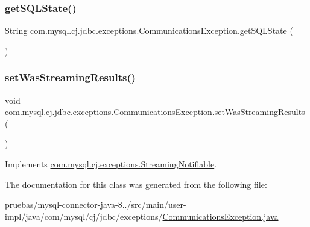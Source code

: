 \subsubsection{\texorpdfstring{get\+S\+Q\+L\+State()}{getSQLState()}}
{\footnotesize\ttfamily String com.\+mysql.\+cj.\+jdbc.\+exceptions.\+Communications\+Exception.\+get\+S\+Q\+L\+State (\begin{DoxyParamCaption}{ }\end{DoxyParamCaption})}

\mbox{\label{classcom_1_1mysql_1_1cj_1_1jdbc_1_1exceptions_1_1_communications_exception_a29388ae45258ad923ba62072c51507ae}} 
\subsubsection{\texorpdfstring{set\+Was\+Streaming\+Results()}{setWasStreamingResults()}}
{\footnotesize\ttfamily void com.\+mysql.\+cj.\+jdbc.\+exceptions.\+Communications\+Exception.\+set\+Was\+Streaming\+Results (\begin{DoxyParamCaption}{ }\end{DoxyParamCaption})}



Implements \mbox{\hyperlink{interfacecom_1_1mysql_1_1cj_1_1exceptions_1_1_streaming_notifiable_af8d92ff2c77b5b28ee8c6076e6a0d377}{com.\+mysql.\+cj.\+exceptions.\+Streaming\+Notifiable}}.



The documentation for this class was generated from the following file\+:\begin{DoxyCompactItemize}
\item 
pruebas/mysql-\/connector-\/java-\/8../src/main/user-\/impl/java/com/mysql/cj/jdbc/exceptions/\mbox{\hyperlink{_communications_exception_8java}{Communications\+Exception.\+java}}\end{DoxyCompactItemize}
